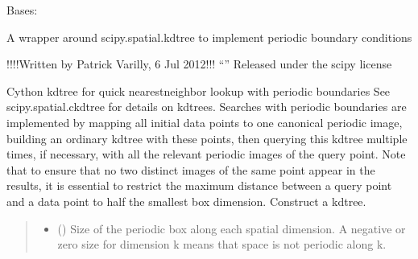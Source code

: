 \documentclass[a4paper,10pt,english]{report}
\begin{document}
\begin{fulllineitems}
\label{\detokenize{NNucleate:NNucleate.utils.PeriodicCKDTree}}
\pysigstartsignatures
{}
\pysigstopsignatures
\sphinxAtStartPar
Bases: 

\sphinxAtStartPar
A wrapper around scipy.spatial.kdtree to implement periodic boundary conditions

\sphinxAtStartPar
!!!!Written by Patrick Varilly, 6 Jul 2012!!!
“”
Released under the scipy license

\sphinxAtStartPar
Cython kd\sphinxhyphen{}tree for quick nearest\sphinxhyphen{}neighbor lookup with periodic boundaries
See scipy.spatial.ckdtree for details on kd\sphinxhyphen{}trees.
Searches with periodic boundaries are implemented by mapping all
initial data points to one canonical periodic image, building an
ordinary kd\sphinxhyphen{}tree with these points, then querying this kd\sphinxhyphen{}tree multiple
times, if necessary, with all the relevant periodic images of the
query point.
Note that to ensure that no two distinct images of the same point
appear in the results, it is essential to restrict the maximum
distance between a query point and a data point to half the smallest
box dimension.
Construct a kd\sphinxhyphen{}tree.
\begin{quote}\begin{description}
\begin{itemize}
\item {} 
\sphinxAtStartPar
{} (\sphinxstyleliteralemphasis{\sphinxupquote{, }}\sphinxstyleliteralemphasis{\sphinxupquote{ (}}\sphinxstyleliteralemphasis{\sphinxupquote{,}}\sphinxstyleliteralemphasis{\sphinxupquote{)}}) \textendash{} Size of the periodic box along each spatial dimension.  A
negative or zero size for dimension k means that space is not
periodic along k.


\end{itemize}
\end{description}
\end{quote}
\end{fulllineitems}
\end{document}
